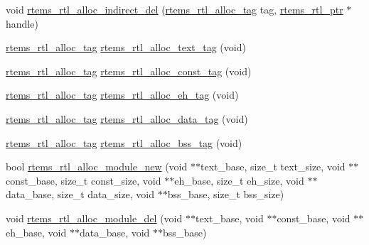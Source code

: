 \begin{DoxyCompactItemize}
\item 
void \mbox{\hyperlink{rtl-allocator_8c_ad8518f137454a1a316fc21d335af10c9}{rtems\+\_\+rtl\+\_\+alloc\+\_\+indirect\+\_\+del}} (\mbox{\hyperlink{rtl-allocator_8h_a445a8615118b7fc14005ab20583153fd}{rtems\+\_\+rtl\+\_\+alloc\+\_\+tag}} tag, \mbox{\hyperlink{structrtems__rtl__ptr}{rtems\+\_\+rtl\+\_\+ptr}} $\ast$handle)
\item 
\mbox{\hyperlink{rtl-allocator_8h_a445a8615118b7fc14005ab20583153fd}{rtems\+\_\+rtl\+\_\+alloc\+\_\+tag}} \mbox{\hyperlink{rtl-allocator_8c_a10334f8df36a4017c69daf53e59baa79}{rtems\+\_\+rtl\+\_\+alloc\+\_\+text\+\_\+tag}} (void)
\item 
\mbox{\hyperlink{rtl-allocator_8h_a445a8615118b7fc14005ab20583153fd}{rtems\+\_\+rtl\+\_\+alloc\+\_\+tag}} \mbox{\hyperlink{rtl-allocator_8c_ac94530ff626eb651e97d142b635e161e}{rtems\+\_\+rtl\+\_\+alloc\+\_\+const\+\_\+tag}} (void)
\item 
\mbox{\hyperlink{rtl-allocator_8h_a445a8615118b7fc14005ab20583153fd}{rtems\+\_\+rtl\+\_\+alloc\+\_\+tag}} \mbox{\hyperlink{rtl-allocator_8c_ac03f273707eb55ed34a1ebcee8fd4a10}{rtems\+\_\+rtl\+\_\+alloc\+\_\+eh\+\_\+tag}} (void)
\item 
\mbox{\hyperlink{rtl-allocator_8h_a445a8615118b7fc14005ab20583153fd}{rtems\+\_\+rtl\+\_\+alloc\+\_\+tag}} \mbox{\hyperlink{rtl-allocator_8c_aac71a304eb90c1c400a3c5113506219a}{rtems\+\_\+rtl\+\_\+alloc\+\_\+data\+\_\+tag}} (void)
\item 
\mbox{\hyperlink{rtl-allocator_8h_a445a8615118b7fc14005ab20583153fd}{rtems\+\_\+rtl\+\_\+alloc\+\_\+tag}} \mbox{\hyperlink{rtl-allocator_8c_a031e1d00b848c1d533d292c60fabd10d}{rtems\+\_\+rtl\+\_\+alloc\+\_\+bss\+\_\+tag}} (void)
\item 
bool \mbox{\hyperlink{rtl-allocator_8c_acb2d42b308fc906eadc8adabfda71b70}{rtems\+\_\+rtl\+\_\+alloc\+\_\+module\+\_\+new}} (void $\ast$$\ast$text\+\_\+base, size\+\_\+t text\+\_\+size, void $\ast$$\ast$const\+\_\+base, size\+\_\+t const\+\_\+size, void $\ast$$\ast$eh\+\_\+base, size\+\_\+t eh\+\_\+size, void $\ast$$\ast$data\+\_\+base, size\+\_\+t data\+\_\+size, void $\ast$$\ast$bss\+\_\+base, size\+\_\+t bss\+\_\+size)
\item 
void \mbox{\hyperlink{rtl-allocator_8c_a718eab4a84e05b311c40633cd0f793e5}{rtems\+\_\+rtl\+\_\+alloc\+\_\+module\+\_\+del}} (void $\ast$$\ast$text\+\_\+base, void $\ast$$\ast$const\+\_\+base, void $\ast$$\ast$eh\+\_\+base, void $\ast$$\ast$data\+\_\+base, void $\ast$$\ast$bss\+\_\+base)
\end{DoxyCompactItemize}


